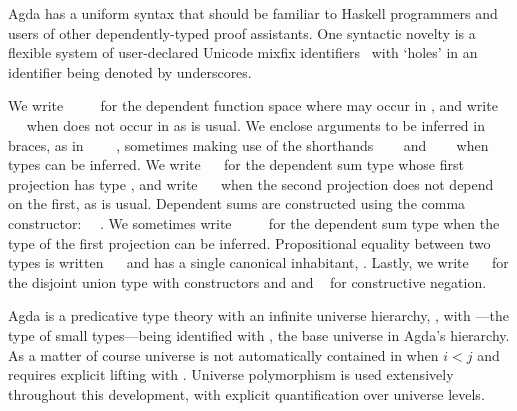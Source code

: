 Agda has a uniform syntax that should be familiar to Haskell programmers and users of other dependently-typed proof assistants.
One syntactic novelty is a flexible system of user-declared Unicode mixfix identifiers~\cite{danielsson_parsing_2011} with `holes' in an identifier being denoted by underscores.

We write \AgdaSymbol{(}~\AgdaSymbol{:}~\AgdaSymbol{)}~~ for the dependent function space where  may occur in , and write ~~ when  does not occur in  as is usual.
We enclose arguments to be inferred in braces, as in \AgdaSymbol{\{}~\AgdaSymbol{:}~\AgdaSymbol{\}}~~, sometimes making use of the shorthands ~~~ and ~\AgdaSymbol{\{}\AgdaSymbol{\}}~~ when types can be inferred.
We write ~~ for the dependent sum type whose first projection has type , and write ~~ when the second projection does not depend on the first, as is usual.
Dependent sums are constructed using the comma constructor: ~\AgdaInductiveConstructor{,}~.
We sometimes write ~~~~ for the dependent sum type when the type of the first projection can be inferred.
Propositional equality between two types is written ~~ and has a single canonical inhabitant, .
Lastly, we write ~~ for the disjoint union type with constructors  and  and ~ for constructive negation.

Agda is a predicative type theory with an infinite universe hierarchy, , with ---the type of small types---being identified with , the base universe in Agda's hierarchy.
As a matter of course universe  is not automatically contained in  when $i < j$ and requires explicit lifting with .
Universe polymorphism is used extensively throughout this development, with explicit quantification over universe levels.

